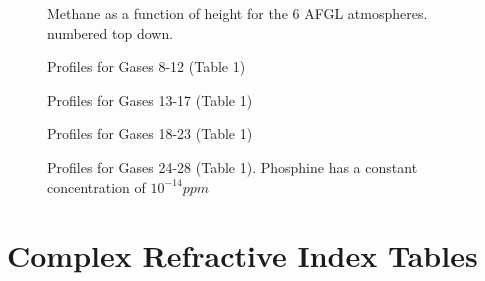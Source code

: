 \documentclass[12pt]{article}
\begin{document}
\newpage
\vspace*{10cm}
\begin{figure}[htb]
\caption{Methane as a function of height for the 6 AFGL atmospheres.
 numbered top down.}
\end{figure}

\newpage
\vspace*{10cm}
\begin{figure}[htb]
\caption{Profiles for Gases 8-12 (Table 1)}
\end{figure}

\newpage
\vspace*{10cm}
\begin{figure}[htb]
\caption{Profiles for Gases 13-17 (Table 1)}
\end{figure}

\newpage
\vspace*{10cm}
\begin{figure}[htb]
\caption{Profiles for Gases 18-23 (Table 1)}
\end{figure}

\newpage
\vspace*{10cm}
\begin{figure}[htb]
\caption{Profiles for Gases 24-28 (Table 1). Phosphine has a constant concentration of $10^{-14}ppm$}
\end{figure}


\section{Complex Refractive Index Tables}
\end{document}
